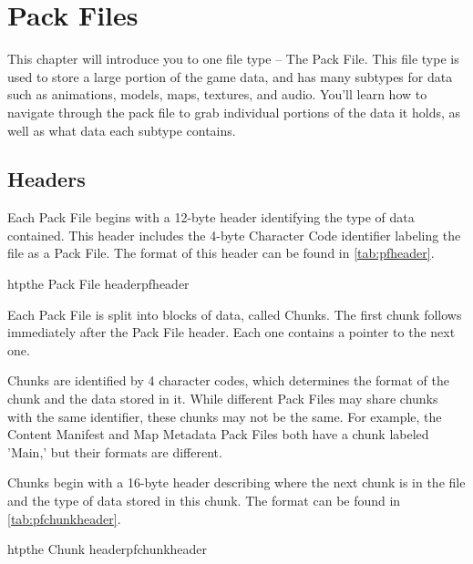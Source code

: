 \chapter{Pack Files}
\label{chap:packfiles}

This chapter will introduce you to one file type -- The Pack File.  This file
type is used to store a large portion of the game data, and has many subtypes
for data such as animations, models, maps, textures, and audio.  You'll learn
how to navigate through the pack file to grab individual portions of the data
it holds, as well as what data each subtype contains.

\section{Headers}
\label{sec:pfheaders}

Each Pack File begins with a 12-byte header identifying the type of data
contained.  This header includes the 4-byte Character Code identifier labeling
the file as a Pack File. The format of this header can be found in
\autoref{tab:pfheader}.

\begin{datastructure}{htp}{the Pack File header}{pfheader}
\end{datastructure}

Each Pack File is split into blocks of data, called Chunks.  The first chunk
follows immediately after the Pack File header.  Each one contains a pointer
to the next one.

Chunks are identified by 4 character codes, which determines the format of the
chunk and the data stored in it.  While different Pack Files may share chunks
with the same identifier, these chunks may not be the same.  For example, the
Content Manifest and Map Metadata Pack Files both have a chunk labeled 'Main,'
but their formats are different.

Chunks begin with a 16-byte header describing where the next chunk is in the
file and the type of data stored in this chunk.  The format can be found in
\autoref{tab:pfchunkheader}.

\begin{datastructure}{htp}{the Chunk header}{pfchunkheader}
\end{datastructure}

